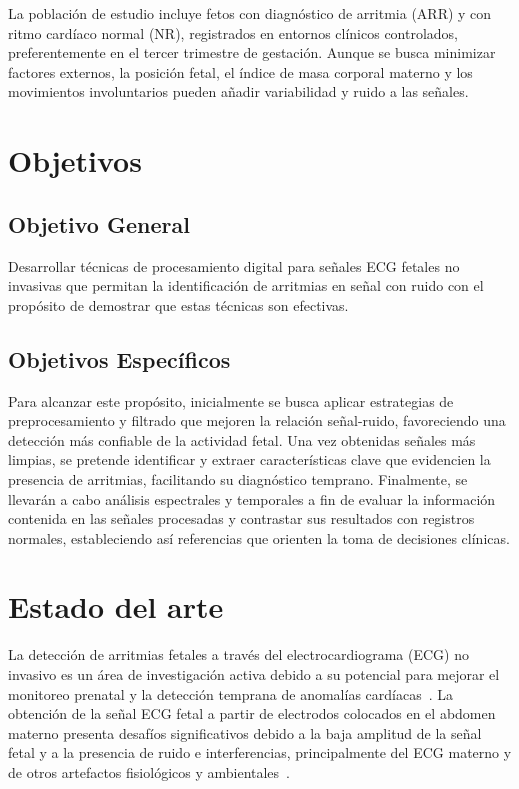\documentclass[10pt, conference]{IEEEtran}
\begin{document}
La población de estudio incluye fetos con diagnóstico de arritmia (ARR) y con ritmo cardíaco normal (NR), registrados en entornos clínicos controlados, preferentemente en el tercer trimestre de gestación. Aunque se busca minimizar factores externos, la posición fetal, el índice de masa corporal materno y los movimientos involuntarios pueden añadir variabilidad y ruido a las señales.
\section{Objetivos}

\subsection{Objetivo General}

Desarrollar técnicas de procesamiento digital para señales ECG fetales no invasivas que permitan la identificación de arritmias en señal con ruido con el propósito de demostrar que estas técnicas son efectivas.

\subsection{Objetivos Específicos}

Para alcanzar este propósito, inicialmente se busca aplicar estrategias de preprocesamiento y filtrado que mejoren la relación señal-ruido, favoreciendo una detección más confiable de la actividad fetal. Una vez obtenidas señales más limpias, se pretende identificar y extraer características clave que evidencien la presencia de arritmias, facilitando su diagnóstico temprano. Finalmente, se llevarán a cabo análisis espectrales y temporales a fin de evaluar la información contenida en las señales procesadas y contrastar sus resultados con registros normales, estableciendo así referencias que orienten la toma de decisiones clínicas.

\section{Estado del arte}

La detección de arritmias fetales a través del electrocardiograma (ECG) no invasivo es un área de investigación activa debido a su potencial para mejorar el monitoreo prenatal y la detección temprana de anomalías cardíacas~\cite{behar2014non}. La obtención de la señal ECG fetal a partir de electrodos colocados en el abdomen materno presenta desafíos significativos debido a la baja amplitud de la señal fetal y a la presencia de ruido e interferencias, principalmente del ECG materno y de otros artefactos fisiológicos y ambientales~\cite{martens2007robust}.
\end{document}
